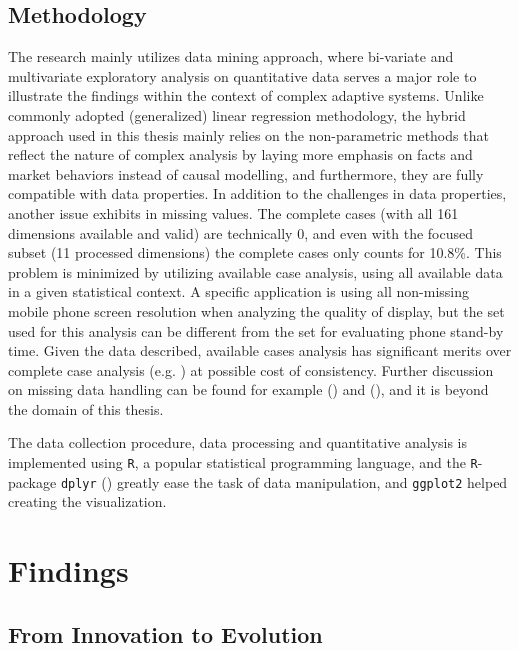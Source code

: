 \documentclass[utf8,english]{gradu3}
\begin{document}
\section{Methodology}

The research mainly utilizes data mining approach, where bi-variate and multivariate exploratory analysis on quantitative data serves a major role to illustrate the findings within the context of complex adaptive systems. Unlike commonly adopted (generalized) linear regression methodology, the hybrid approach used in this thesis mainly relies on the non-parametric methods that reflect the nature of complex analysis by laying more emphasis on facts and market behaviors instead of causal modelling, and furthermore, they are fully compatible with data properties. In addition to the challenges in data properties, another issue exhibits in missing values. The complete cases (with all 161 dimensions available and valid) are technically 0, and even with the focused subset (11 processed dimensions) the complete cases only counts for 10.8\%. This problem is minimized by utilizing available case analysis, using all available data in a given statistical context. A specific application is using all non-missing mobile phone screen resolution when analyzing the quality of display, but the set used for this analysis can be different from the set for evaluating phone stand-by time. Given the data described, available cases analysis has significant merits over complete case analysis (e.g. \cite{kim1977treatment}) at possible cost of consistency. Further discussion on missing data handling can be found for example \citeauthor{little2014statistical} (\citeyear{little2014statistical}) and \citeauthor{pigott2001review} (\citeyear{pigott2001review}), and it is beyond the domain of this thesis.

The data collection procedure, data processing and quantitative analysis is implemented using \texttt{R}, a popular statistical programming language, and the \texttt{R}-package \texttt{dplyr} (\cite{dplyr}) greatly ease the task of data manipulation, and \texttt{ggplot2} helped creating the visualization.

\chapter{Findings}

\section{From Innovation to Evolution}
\end{document}
